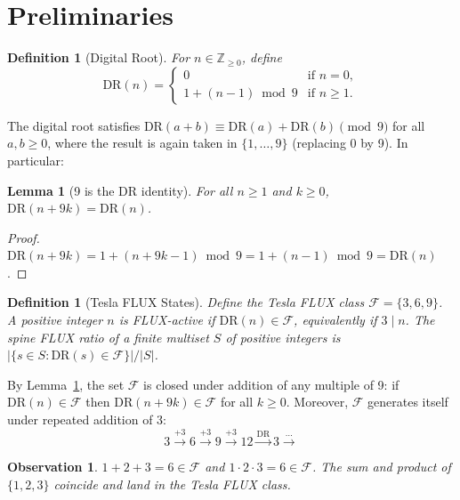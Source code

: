 \documentclass[12pt]{article}
\newtheorem{lemma}[theorem]{Lemma}
\newtheorem{definition}[theorem]{Definition}
\newtheorem{observation}[theorem]{Observation}
\begin{document}
\section{Preliminaries}
\label{sec:prelim}

\begin{definition}[Digital Root]
For $n \in \mathbb{Z}_{\geq 0}$, define
\[
    \mathrm{DR}(n) =
    \begin{cases}
        0 & \text{if } n = 0, \\
        1 + (n-1)\bmod 9 & \text{if } n \geq 1.
    \end{cases}
\]
\end{definition}

The digital root satisfies $\mathrm{DR}(a+b) \equiv \mathrm{DR}(a)+\mathrm{DR}(b)
\pmod{9}$ for all $a,b\geq 0$, where the result is again taken in $\{1,\ldots,9\}$
(replacing 0 by 9).  In particular:

\begin{lemma}[9 is the DR identity]
\label{lem:identity}
For all $n \geq 1$ and $k \geq 0$,\; $\mathrm{DR}(n + 9k) = \mathrm{DR}(n)$.
\end{lemma}

\begin{proof}
$\mathrm{DR}(n+9k) = 1 + (n+9k-1)\bmod 9 = 1 + (n-1)\bmod 9 = \mathrm{DR}(n)$.
\end{proof}

\begin{definition}[Tesla FLUX States]
Define the \emph{Tesla FLUX class} $\mathcal{F} = \{3, 6, 9\}$.
A positive integer $n$ is \emph{FLUX-active} if $\mathrm{DR}(n) \in \mathcal{F}$,
equivalently if $3 \mid n$.  The \emph{spine FLUX ratio} of a finite multiset
$S$ of positive integers is $|\{s \in S : \mathrm{DR}(s)\in\mathcal{F}\}|/|S|$.
\end{definition}

By Lemma~\ref{lem:identity}, the set $\mathcal{F}$ is closed under addition of
any multiple of 9: if $\mathrm{DR}(n)\in\mathcal{F}$ then $\mathrm{DR}(n+9k)
\in \mathcal{F}$ for all $k\geq 0$.  Moreover, $\mathcal{F}$ generates itself
under repeated addition of 3:
\[
    3 \xrightarrow{+3} 6 \xrightarrow{+3} 9 \xrightarrow{+3} 12 \xrightarrow{\mathrm{DR}} 3 \xrightarrow{\cdots}
\]

\begin{observation}
$1+2+3 = 6 \in \mathcal{F}$ and $1\cdot2\cdot3 = 6 \in \mathcal{F}$.
The sum and product of $\{1,2,3\}$ coincide and land in the Tesla FLUX class.
\end{observation}
\end{document}
